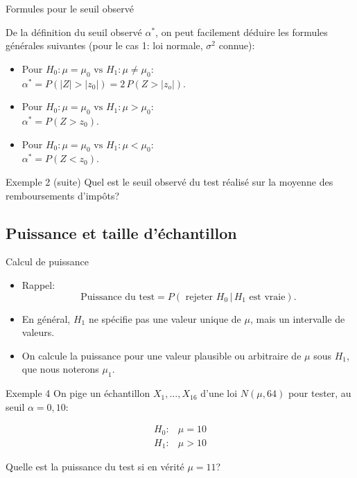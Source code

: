 \documentclass{BeamerTemplate}
\begin{document}
\begin{frame}[t]{Formules pour le seuil observé}

 {\small
 De la définition du seuil observé $\alpha^*$, on peut facilement déduire
les formules générales suivantes (pour le cas 1: loi normale, $\sigma^2$ connue):

 \begin{itemize}\itemsep4mm
 \item Pour $H_0 : \mu = \mu_0 \mbox{ vs } H_1 : \mu \neq \mu_0$:\\
 $\alpha^*=P(|Z|>|z_{0}|)=2\,P(Z>|z_{o}|)$.
 \item Pour $H_0 : \mu = \mu_0 \mbox{ vs } H_1 : \mu > \mu_0$:\\
 $\alpha^*=P(Z>z_{0})$.
 \item Pour $H_0 : \mu = \mu_0 \mbox{ vs } H_1 : \mu < \mu_0$:\\
 $\alpha^*=P(Z<z_{0})$.
 \end{itemize}
 }
\end{frame}

\begin{frame}[t]{Exemple 2 (suite)}
Quel est le seuil observé du test réalisé sur la moyenne des remboursements d'impôts?
{\ }
\end{frame}



\subsection{Puissance et taille d'échantillon}

\begin{frame}[t]{Calcul de puissance}

\begin{itemize}\itemsep7mm
\item Rappel: $$\text{Puissance du test}=P(\text{ rejeter } H_0\,|\,H_1 \text{  est vraie}).$$
\item En général, $H_1$ ne spécifie pas une valeur unique de $\mu$, mais un intervalle de valeurs.
\item On calcule la puissance pour une valeur plausible ou arbitraire de $\mu$ sous $H_1$, que nous noterons $\mu_1$.
\end{itemize}
\end{frame}

\begin{frame}[t]{Exemple 4}
On pige un échantillon $X_1, \ldots, X_{16}$  d'une loi $N(\mu, 64)$ pour tester, au seuil $\alpha = 0,10$:

 $$\begin{array}{ll}
 H_0 : &\mu = 10\\ H_1 : &\mu > 10
 \end{array}$$

 Quelle est la puissance du test si en vérité $\mu = 11$?
\end{frame}
\end{document}
